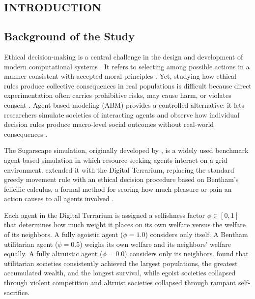 \documentclass{icsthesis}
\begin{document}
	\begin{mainmatter}
		\section{INTRODUCTION}
			\subsection{Background of the Study}
Ethical decision-making is a central challenge in the design and development of modern computational systems \citep{Miranda2010,Majot2014,KremerHerman2024,Bontempi2025}. It refers to selecting among possible actions in a manner consistent with accepted moral principles \citep{Pembi2024,MacDougall2014}. Yet, studying how ethical rules produce collective consequences in real populations is difficult because direct experimentation often carries prohibitive risks, may cause harm, or violates consent \citep{LasquetyReyes2018,Slater2006,Groff2019}. Agent-based modeling (ABM) provides a controlled alternative: it lets researchers simulate societies of interacting agents and observe how individual decision rules produce macro-level social outcomes without real-world consequences \citep{Scalco2015,Tolk2022}.

The Sugarscape simulation, originally developed by \citet{EpsteinAxtell1996}, is a widely used benchmark agent-based simulation in which resource-seeking agents interact on a grid environment. \citet{KremerHerman2024} extended it with the Digital Terrarium, replacing the standard greedy movement rule with an ethical decision procedure based on Bentham's felicific calculus, a formal method for scoring how much pleasure or pain an action causes to all agents involved \citep{Bentham1907,Baujard2009}.

Each agent in the Digital Terrarium is assigned a selfishness factor $\phi \in [0, 1]$ that determines how much weight it places on its own welfare versus the welfare of its neighbors. A fully egoistic agent ($\phi = 1.0$) considers only itself. A Bentham utilitarian agent ($\phi = 0.5$) weighs its own welfare and its neighbors' welfare equally. A fully altruistic agent ($\phi = 0.0$) considers only its neighbors. \citet{KremerHerman2024} found that utilitarian societies consistently achieved the largest populations, the greatest accumulated wealth, and the longest survival, while egoist societies collapsed through violent competition and altruist societies collapsed through rampant self-sacrifice.


\end{mainmatter}
\end{document}
